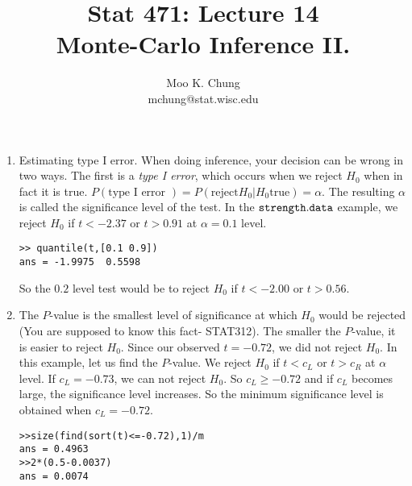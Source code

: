 \documentclass[12pt,twocolumn]{article} %
\begin{document}
\title{Stat 471: Lecture 14\\
Monte-Carlo Inference II.}
\author{Moo K. Chung\\
mchung@stat.wisc.edu}
\maketitle \thispagestyle{empty}

\begin{enumerate}


\item Estimating type I error. When doing inference, your decision
can be wrong in two ways. The first is a {\em type I error}, which
occurs when we reject $H_0$ when in fact it is true. $P(\mbox{
type I error })=P(\mbox{reject} H_0 | H_0 \mbox{true}) =\alpha$.
The resulting $\alpha$ is called the significance level of the
test. In the $\tt{strength.data}$ example, we reject $H_0$ if
$t<-2.37$ or $t>0.91$ at $\alpha=0.1$ level.
\begin{verbatim}
>> quantile(t,[0.1 0.9])
ans = -1.9975  0.5598
\end{verbatim}
So the $0.2$ level test would be to reject $H_0$ if $t < -2.00$ or
$t>0.56$.


\item The $P$-value is the smallest level of significance at which
$H_0$ would be rejected (You are supposed to know this fact-
STAT312). The smaller the $P$-value, it is easier to reject $H_0$.
 Since our observed
$t=-0.72$, we did not reject $H_0$. In this example, let us find
the $P$-value. We reject $H_0$ if $t < c_L$ or $t > c_R$ at
$\alpha$ level. If $c_L=-0.73$, we can not reject $H_0$. So
$c_L\geq -0.72$ and if $c_L$ becomes large, the significance level
increases. So the minimum significance level is obtained when
$c_L=-0.72$.
\begin{verbatim}
>>size(find(sort(t)<=-0.72),1)/m
ans = 0.4963
>>2*(0.5-0.0037)
ans = 0.0074
\end{verbatim}


\end{enumerate}
\end{document}
